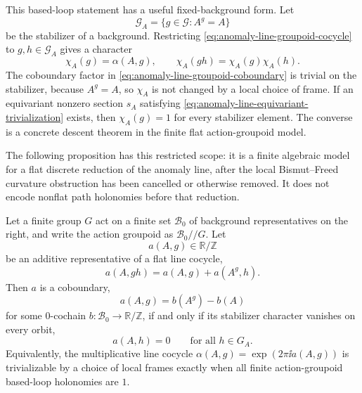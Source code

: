 This based-loop statement has a useful fixed-background form.  Let
\[
  \mathcal G_A=\{g\in\mathcal G:A^g=A\}
\]
be the stabilizer of a background.  Restricting
\eqref{eq:anomaly-line-groupoid-cocycle} to \(g,h\in\mathcal G_A\) gives a
character
\[
  \chi_A(g)=\alpha(A,g),
  \qquad
  \chi_A(gh)=\chi_A(g)\chi_A(h).
\]
The coboundary factor in
\eqref{eq:anomaly-line-groupoid-coboundary} is trivial on the stabilizer,
because \(A^g=A\), so \(\chi_A\) is not changed by a local choice of frame.
If an equivariant nonzero section \(s_A\) satisfying
\eqref{eq:anomaly-line-equivariant-trivialization} exists, then
\(\chi_A(g)=1\) for every stabilizer element.  The converse is a concrete
descent theorem in the finite flat action-groupoid model.

The following proposition has this restricted scope: it is a finite
algebraic model for a flat discrete reduction of the anomaly line, after the
local Bismut--Freed curvature obstruction has been cancelled or otherwise
removed.  It does not encode nonflat path holonomies before that reduction.

\begin{proposition}
\label{prop:finite-action-groupoid-descent-criterion}
Let a finite group \(G\) act on a finite set \(\mathcal B_0\) of background
representatives on the right, and write the action groupoid as
\(\mathcal B_0//G\).  Let
\[
  a(A,g)\in\mathbb R/\mathbb Z
\]
be an additive representative of a flat line cocycle,
\begin{equation}
  a(A,gh)=a(A,g)+a(A^g,h).
  \label{eq:finite-action-groupoid-additive-cocycle}
\end{equation}
Then \(a\) is a coboundary,
\begin{equation}
  a(A,g)=b(A^g)-b(A)
  \label{eq:finite-action-groupoid-coboundary}
\end{equation}
for some \(0\)-cochain \(b:\mathcal B_0\to\mathbb R/\mathbb Z\), if and only
if its stabilizer character vanishes on every orbit,
\begin{equation}
  a(A,h)=0
  \qquad
  \text{for all }h\in G_A .
  \label{eq:finite-action-groupoid-stabilizer-vanishing}
\end{equation}
Equivalently, the multiplicative line cocycle
\(\alpha(A,g)=\exp(2\pi\ii a(A,g))\) is trivializable by a choice of local
frames exactly when all finite action-groupoid based-loop holonomies are
\(1\).
\end{proposition}


